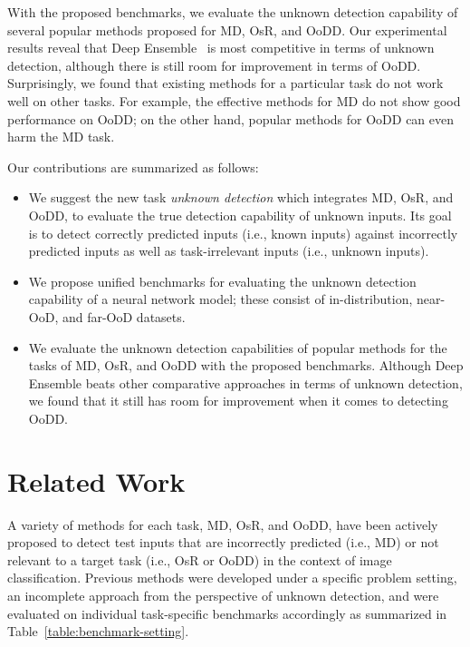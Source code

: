 \documentclass[preprint,12pt]{elsarticle}
\begin{document}
With the proposed benchmarks, we evaluate the unknown detection capability of several popular methods proposed for MD, OsR, and OoDD. Our experimental results reveal that Deep Ensemble~\citep{lakshminarayanan2016simple} is most competitive in terms of unknown detection, although there is still room for improvement in terms of OoDD. Surprisingly, we found that existing methods for a particular task do not work well on other tasks. For example, the effective methods for MD do not show good performance on OoDD; on the other hand, popular methods for OoDD can even harm the MD task.

Our contributions are summarized as follows:
\begin{itemize}
    \item We suggest the new task \emph{unknown detection} which integrates MD, OsR, and OoDD, to evaluate the true detection capability of unknown inputs. Its goal is to detect correctly predicted inputs (i.e., known inputs) against incorrectly predicted inputs as well as task-irrelevant inputs (i.e., unknown inputs).
    \item We propose unified benchmarks for evaluating the unknown detection capability of a neural network model; these consist of in-distribution, near-OoD, and far-OoD datasets. 
    \item We evaluate the unknown detection capabilities of popular methods for the tasks of MD, OsR, and OoDD with the proposed benchmarks. Although Deep Ensemble beats other comparative approaches in terms of unknown detection, we found that it still has room for improvement when it comes to detecting OoDD.
\end{itemize}

\section{Related Work} \label{sec:seection2}
A variety of methods for each task, MD, OsR, and OoDD, have been actively proposed to detect test inputs that are incorrectly predicted (i.e., MD) or not relevant to a target task (i.e., OsR or OoDD) in the context of image classification. Previous methods were developed under a specific problem setting, an incomplete approach from the perspective of unknown detection, and were evaluated on individual task-specific benchmarks accordingly as summarized in Table~\ref{table:benchmark-setting}.
\end{document}
